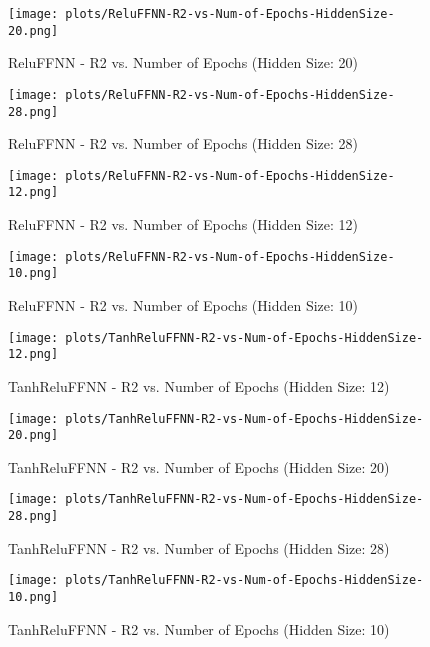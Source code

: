 
\begin{figure}[H]
    \centering
    \texttt{[image: plots/ReluFFNN-R2-vs-Num-of-Epochs-HiddenSize-20.png]}
    \caption{ReluFFNN - R2 vs. Number of Epochs (Hidden Size: 20)}
\end{figure}

\begin{figure}[H]
    \centering
    \texttt{[image: plots/ReluFFNN-R2-vs-Num-of-Epochs-HiddenSize-28.png]}
    \caption{ReluFFNN - R2 vs. Number of Epochs (Hidden Size: 28)}
\end{figure}

\begin{figure}[H]
    \centering
    \texttt{[image: plots/ReluFFNN-R2-vs-Num-of-Epochs-HiddenSize-12.png]}
    \caption{ReluFFNN - R2 vs. Number of Epochs (Hidden Size: 12)}
\end{figure}

\begin{figure}[H]
    \centering
    \texttt{[image: plots/ReluFFNN-R2-vs-Num-of-Epochs-HiddenSize-10.png]}
    \caption{ReluFFNN - R2 vs. Number of Epochs (Hidden Size: 10)}
\end{figure}

\begin{figure}[H]
    \centering
    \texttt{[image: plots/TanhReluFFNN-R2-vs-Num-of-Epochs-HiddenSize-12.png]}
    \caption{TanhReluFFNN - R2 vs. Number of Epochs (Hidden Size: 12)}
\end{figure}

\begin{figure}[H]
    \centering
    \texttt{[image: plots/TanhReluFFNN-R2-vs-Num-of-Epochs-HiddenSize-20.png]}
    \caption{TanhReluFFNN - R2 vs. Number of Epochs (Hidden Size: 20)}
\end{figure}

\begin{figure}[H]
    \centering
    \texttt{[image: plots/TanhReluFFNN-R2-vs-Num-of-Epochs-HiddenSize-28.png]}
    \caption{TanhReluFFNN - R2 vs. Number of Epochs (Hidden Size: 28)}
\end{figure}

\begin{figure}[H]
    \centering
    \texttt{[image: plots/TanhReluFFNN-R2-vs-Num-of-Epochs-HiddenSize-10.png]}
    \caption{TanhReluFFNN - R2 vs. Number of Epochs (Hidden Size: 10)}
\end{figure}

